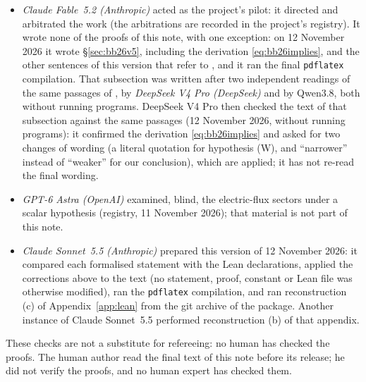 \documentclass[11pt,a4paper]{article}
\theoremstyle{plain}
\theoremstyle{definition}
\theoremstyle{remark}
\numberwithin{equation}{section}
\begin{document}
\begin{itemize}
\item \emph{Claude Fable~5.2 (Anthropic)} acted as the project's pilot: it directed and arbitrated the work (the arbitrations are recorded in the project's registry). It wrote none of the proofs of this note, with one exception: on 12 November 2026 it wrote \S\ref{sec:bb26v5}, including the derivation \eqref{eq:bb26implies}, and the other sentences of this version that refer to \cite{BB26v5}, and it ran the final \texttt{pdflatex} compilation. That subsection was written after two independent readings of the same passages of \cite{BB26v5}, by \emph{DeepSeek V4 Pro (DeepSeek)} and by Qwen3.8, both without running programs. DeepSeek V4 Pro then checked the text of that subsection against the same passages (12 November 2026, without running programs): it confirmed the derivation \eqref{eq:bb26implies} and asked for two changes of wording (a literal quotation for hypothesis (W), and ``narrower'' instead of ``weaker'' for our conclusion), which are applied; it has not re-read the final wording.
\item \emph{GPT-6 Astra (OpenAI)} examined, blind, the electric-flux sectors under a scalar hypothesis (registry, 11 November 2026); that material is not part of this note.
\item \emph{Claude Sonnet~5.5 (Anthropic)} prepared this version of 12 November 2026: it compared each formalised statement with the Lean
declarations, applied the corrections above to the text (no statement, proof, constant or Lean file was otherwise modified), ran the
\texttt{pdflatex} compilation, and ran reconstruction (c) of Appendix~\ref{app:lean} from the git archive of the package. Another instance of Claude Sonnet~5.5 performed
reconstruction (b) of that appendix.
\end{itemize}
These checks are not a substitute for refereeing: no human has checked the proofs.
The human author read the final text of this note before its release; he did not verify the proofs, and no human expert has checked them.
\end{document}
